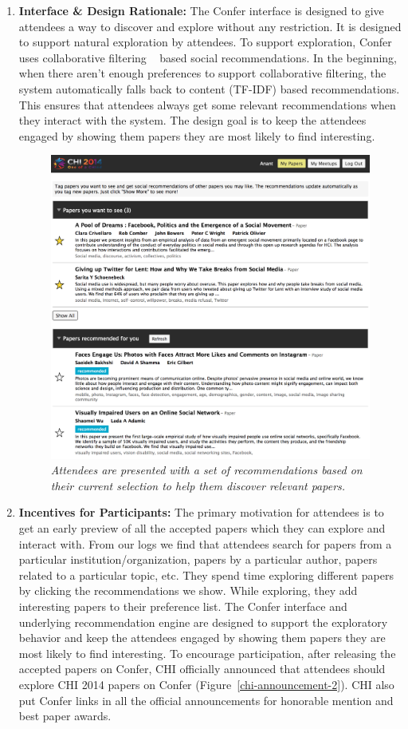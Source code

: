 \documentclass[letterpaper]{article}
\begin{document}
\begin{enumerate}[I]
\item \textbf{Interface \& Design Rationale:} The Confer interface is designed to give attendees a way to discover and explore without any restriction. It is designed to support {natural exploration} by attendees. To support exploration, Confer uses collaborative filtering ~\cite{CollaborativeFiltering} based social recommendations. In the beginning, when there aren't enough preferences to support collaborative filtering, the system automatically falls back to content (TF-IDF) based recommendations. This ensures that attendees always get some relevant recommendations when they interact with the system. The design goal is to keep the attendees engaged by showing them papers they are most likely to find interesting.
 
\begin{figure}[!h]
\centering
\includegraphics[width=0.9\columnwidth]{confer-recommendations.png}
\caption{\emph{Attendees are presented with a set of recommendations based on their current selection to help them discover relevant papers.}}
\label{confer-recommendations}
\end{figure}
\item \textbf{Incentives for Participants:} The primary motivation for attendees is to get an early preview of all the accepted papers which they can explore and interact with. From our logs we find that attendees search for papers from a particular institution/organization, papers by a particular author, papers related to a particular topic, etc. They spend time exploring different papers by clicking the recommendations we show. While exploring, they add interesting papers to their preference list. The Confer interface and underlying recommendation engine are designed to support the exploratory behavior and keep the attendees engaged by showing them papers they are most likely to find interesting. To encourage participation, after releasing the accepted papers on Confer, CHI officially announced that attendees should explore CHI 2014 papers on Confer (Figure~\ref{chi-announcement-2}). CHI also put Confer links in all the official announcements for honorable mention and best paper awards. 


\end{enumerate}
\end{document}
